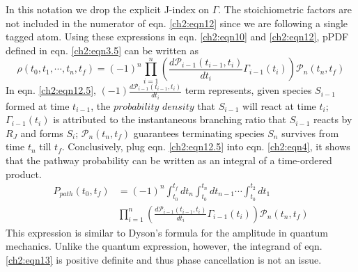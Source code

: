 In this notation we drop the explicit J-index on $\Gamma$. The stoichiometric factors are not
included in the numerator of eqn. \ref{ch2:eqn12} since we are following a single tagged
atom. Using these expressions in eqn. \ref{ch2:eqn10} and \ref{ch2:eqn12}, pPDF defined in eqn. \ref{ch2:eqn3.5} can be written as 
\begin{equation}
\label{ch2:eqn12.5}
\rho(t_0, t_1, \cdots, t_n, t_f) = (-1)^n \prod_{i=1}^{n}{\left( \frac{d\mathcal{P}_{i-1}(t_{i-1},t_i)}{dt_i} \Gamma_{i-1}(t_i) \right) \mathcal{P}_{n}(t_n,t_f)}
\end{equation}
In eqn. \ref{ch2:eqn12.5}, $(-1)\frac{d\mathcal{P}_{i-1}(t_{i-1},t_i)}{dt_i}$ term represents, given species $S_{i-1}$ formed at time $t_{i-1}$, the $probability$ $density$ that $S_{i-1}$ will react at time $t_i$; $\Gamma_{i-1}(t_i)$ is attributed to the instantaneous branching ratio that $S_{i-1}$ reacts by $R_J$ and forms $S_i$; $\mathcal{P}_{n}(t_n,t_f)$ guarantees terminating species $S_n$ survives from time $t_n$ till $t_f$. Conclusively, plug eqn. \ref{ch2:eqn12.5} into eqn. \ref{ch2:eqn4}, it shows that the pathway probability can be
written as an integral of a time-ordered product.\cite{ch1_IRPC_16_ch3_6_ch4_8_bai2014sum,ch1_IRPC_17_ch4_9_bai2015sum}
\begin{equation}
\label{ch2:eqn13}
\begin{split}
P_{path}(t_0,t_f)&= (-1)^n \int_{t_0}^{t_f}{dt_n \int_{t_0}^{t_n}{dt_{n-1} \cdots }} \int_{t_0}^{t_2}{dt_1} \\
&  \prod_{i=1}^{n}{\left( \frac{d\mathcal{P}_{i-1}(t_{i-1},t_i)}{dt_i} \Gamma_{i-1}(t_i) \right) \mathcal{P}_{n}(t_n,t_f)}
\end{split}
\end{equation}
This expression is similar to Dyson’s formula for the amplitude in quantum mechanics.\cite{ch1_IRPC_38_schulmann1996techniques,ch1_IRPC_39_mjolsness2013time} Unlike the quantum expression, however, the integrand of eqn. \ref{ch2:eqn13} is positive definite and thus phase cancellation is not an issue.
\newline
